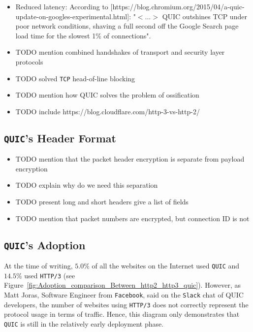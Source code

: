\documentclass[12pt,a4paper,twoside,openright]{report}
\begin{document}
\begin{itemize}
  \item Reduced latency:
  According to [https://blog.chromium.org/2015/04/a-quic-update-on-googles-experimental.html]: "$<\ldots>$ QUIC outshines TCP under poor network conditions, shaving a full second off the Google Search page load time for the slowest 1\% of connections".
  \item TODO mention combined handshakes of transport and security layer protocols 

  \item TODO solved \texttt{TCP} head-of-line blocking

  
  \item TODO mention how QUIC solves the problem of ossification
  
  \item TODO include https://blog.cloudflare.com/http-3-vs-http-2/
\end{itemize}




\subsection{\texttt{QUIC}'s Header Format} \label{subsection_QUIC_header_format}

\begin{itemize}
  \item TODO mention that the packet header encryption is separate from payload encryption
  \item TODO explain why do we need this separation
  \item TODO present long and short headers give a list of fields
  \item TODO mention that packet numbers are encrypted, but connection ID is not
\end{itemize}

\subsection{\texttt{QUIC}'s Adoption}

At the time of writing, $5.0\%$ of all the websites on the Internet used \texttt{QUIC} and $14.5\%$ used \texttt{HTTP/3} \cite{bib_Adoption_comparison_Between_http2_http3_quic}
(see Figure~\ref{fig:Adoption_comparison_Between_http2_http3_quic}).
However, as Matt Joras, Software Engineer from \texttt{Facebook}, said on the \texttt{Slack} chat of QUIC developers, the number of websites using \texttt{HTTP/3} does not correctly represent the protocol usage in terms of traffic. 
Hence, this diagram only demonstrates that \texttt{QUIC} is still in the relatively early deployment phase.
\end{document}

